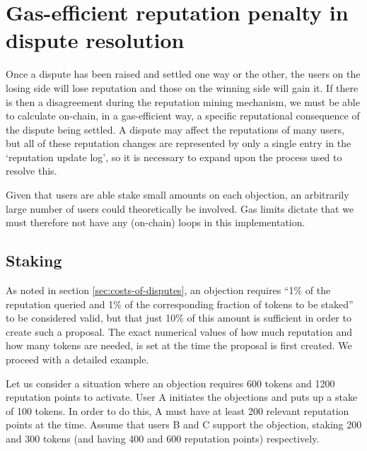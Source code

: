 \clearpage
\section{Gas-efficient reputation penalty in dispute resolution}\label{appendix:rep-transfer}

Once a dispute has been raised and settled one way or the other, the users on the losing side will lose reputation and those on the winning side will gain it. If there is then a disagreement during the reputation mining mechanism, we must be able to calculate on-chain, in a gas-efficient way, a specific reputational consequence of the dispute being settled. A dispute may affect the reputations of many users, but all of these reputation changes are represented by only a single entry in the `reputation update log', so it is necessary to expand upon the process used to resolve this.

Given that users are able stake small amounts on each objection, an arbitrarily large number of users could theoretically be involved. Gas limits dictate that we must therefore not have any (on-chain) loops in this implementation.

\subsection{Staking}

As noted in section \ref{sec:costs-of-disputes}, an objection requires ``1\% of the reputation queried and 1\% of the corresponding fraction of tokens to be staked'' to be considered valid, but that just 10\% of this amount is sufficient in order to create such a proposal. The exact numerical values of how much reputation and how many tokens are needed, is set at the time the proposal is first created. We proceed with a detailed example.

Let us consider a situation where an objection requires 600 tokens and 1200 reputation points to activate. User A initiates the objections and puts up a stake of 100 tokens. In order to do this, A must have at least 200 relevant reputation points at the time. Assume that users B and C support the objection, staking 200 and 300 tokens (and having 400 and 600 reputation points) respectively.  


